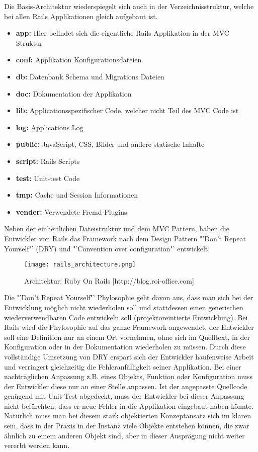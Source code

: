 Die Basis-Architektur wiederspiegelt sich auch in der Verzeichnisstruktur, welche bei allen Rails Applikationen gleich aufgebaut ist. 

\begin{itemize}
\item \textbf{app:} Hier befindet sich die eigentliche Rails Applikation in der MVC Struktur
\item \textbf{conf:} Applikation Konfigurationsdateien
\item \textbf{db:} Datenbank Schema und Migrations Dateien
\item \textbf{doc:} Dokumentation der Applikation
\item \textbf{lib:} Applicationsspezifischer Code, welcher nicht Teil des MVC Code ist
\item \textbf{log:} Applications Log
\item \textbf{public:} JavaScript, CSS, Bilder und andere statische Inhalte
\item \textbf{script:} Rails Scripts
\item \textbf{test:} Unit-test Code
\item \textbf{tmp:} Cache und Session Informationen
\item \textbf{vender: }Verwendete Fremd-Plugins
\end{itemize}


Neben der einheitlichen Dateistruktur und dem MVC Pattern, haben die Entwickler von Rails das Framework nach dem Design Pattern "'Don't Repeat Yourself"' (DRY) und "'Convention over configuration"' entwickelt.

\begin{figure}[htb]
\centering
\texttt{[image: rails\_architecture.png]}
\caption{Architektur: Ruby On Rails [http://blog.roi-office.com]}
\label{fig:RubyOnRails}
\end{figure} 

Die "'Don't Repeat Yourself"' Phylosophie geht davon aus, dass man sich bei der Entwicklung möglich nicht wiederholen soll und stattdessen einen generischen wiederverwendbaren Code entwickeln soll (projektoreintierte Entwicklung). 
Bei Rails wird die Phylosophie auf das ganze Framework angewendet, der Entwickler soll eine Definition nur an einem Ort vornehmen, ohne sich im Quelltext, in der Konfiguration oder in der Dokumentation wiederholen zu müssen. Durch diese vollständige Umsetzung von DRY erspart sich der Entwickler haufenweise Arbeit und verringert gleichzeitig die Fehleranfälligkeit seiner Applikation. Bei einer nachträglichen Anpassung z.B. eines Objekts, Funktion oder Konfiguration muss der Entwickler diese nur an einer Stelle anpassen. Ist der angepasste Quellcode genügend mit Unit-Test abgedeckt, muss der Entwickler bei dieser Anpassung nicht befürchten, dass er neue Fehler in die Applikation eingebaut haben könnte. Natürlich muss man bei diesem stark objektierten Konzeptansatz sich im klaren sein, dass in der Praxis in der Instanz viele Objekte entstehen können, die zwar ähnlich zu einem anderen Objekt sind, aber in dieser Ausprägung nicht weiter vererbt werden kann.

